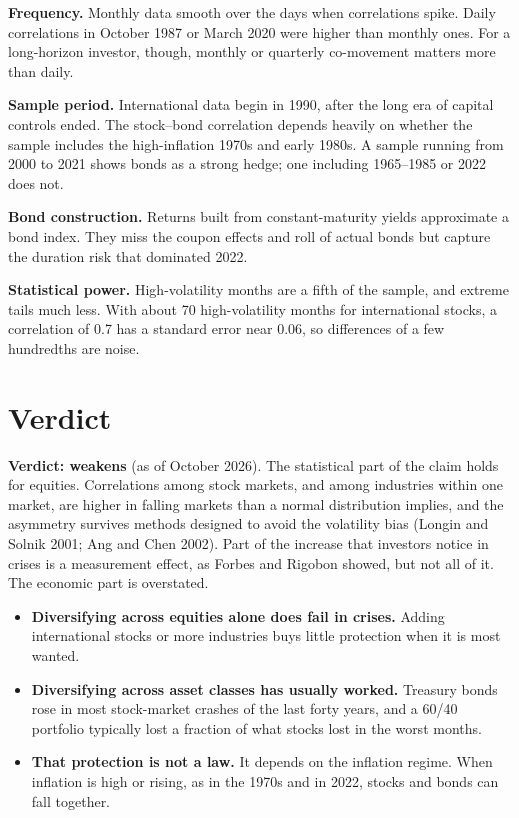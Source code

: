 \textbf{Frequency.} Monthly data smooth over the days when correlations spike. Daily correlations in October 1987 or March 2020 were higher than monthly ones. For a long-horizon investor, though, monthly or quarterly co-movement matters more than daily.

\textbf{Sample period.} International data begin in 1990, after the long era of capital controls ended. The stock--bond correlation depends heavily on whether the sample includes the high-inflation 1970s and early 1980s. A sample running from 2000 to 2021 shows bonds as a strong hedge; one including 1965--1985 or 2022 does not.

\textbf{Bond construction.} Returns built from constant-maturity yields approximate a bond index. They miss the coupon effects and roll of actual bonds but capture the duration risk that dominated 2022.

\textbf{Statistical power.} High-volatility months are a fifth of the sample, and extreme tails much less. With about 70 high-volatility months for international stocks, a correlation of 0.7 has a standard error near 0.06, so differences of a few hundredths are noise.

\section{Verdict}
\label{sec:20-verdict}

\begin{callout}
\textbf{Verdict: weakens} (as of October 2026). The statistical part of the claim holds for equities. Correlations among stock markets, and among industries within one market, are higher in falling markets than a normal distribution implies, and the asymmetry survives methods designed to avoid the volatility bias (Longin and Solnik 2001; Ang and Chen 2002). Part of the increase that investors notice in crises is a measurement effect, as Forbes and Rigobon showed, but not all of it. The economic part is overstated.
\end{callout}

\begin{itemize}
  \item \textbf{Diversifying across equities alone does fail in crises.} Adding international stocks or more industries buys little protection when it is most wanted.
  \item \textbf{Diversifying across asset classes has usually worked.} Treasury bonds rose in most stock-market crashes of the last forty years, and a 60/40 portfolio typically lost a fraction of what stocks lost in the worst months.
  \item \textbf{That protection is not a law.} It depends on the inflation regime. When inflation is high or rising, as in the 1970s and in 2022, stocks and bonds can fall together.
\end{itemize}

